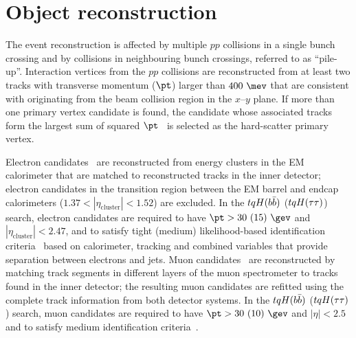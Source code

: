 
\section{Object reconstruction}
\label{sec:objects}

The event reconstruction is affected by multiple $pp$ collisions in a single bunch crossing and by collisions
in neighbouring bunch crossings, referred to as ``pile-up''. 
Interaction vertices from the $pp$ collisions are reconstructed from at least two tracks 
with transverse momentum ($\pt$) larger than $400~\mev$ that are consistent with originating from the 
beam collision region in the $x$--$y$ plane. If more than one primary vertex candidate is found, the
candidate whose associated tracks form the largest sum of squared $\pt$~\cite{ATL-PHYS-PUB-2015-026}
is selected as the hard-scatter primary vertex.

Electron candidates~\cite{ATLAS-CONF-2016-024,ATL-PHYS-PUB-2016-015} are reconstructed from energy 
clusters in the EM calorimeter that are matched to reconstructed tracks in the inner detector;
electron candidates in the transition region between the EM barrel and endcap calorimeters 
($1.37 < |\eta_{\textrm{cluster}}| < 1.52$) are excluded.
In the $tqH(b\bar{b})$ ($tqH(\tau\tau)$) search, electron candidates are required to have $\pt>30~(15)~\gev$ and 
$|\eta_{\textrm{cluster}}| < 2.47$, and to satisfy tight (medium) likelihood-based identification 
criteria~\cite{ATLAS-CONF-2016-024} based on calorimeter, tracking and combined variables that provide 
separation between electrons and jets. 
Muon candidates~\cite{Aad:2016jkr} are reconstructed by matching track segments in %
different layers of the muon spectrometer to tracks found in the inner detector;
the resulting muon candidates are refitted using the complete track information from both detector systems.
In the $tqH(b\bar{b})$ ($tqH(\tau\tau)$) search, muon candidates are required to have $\pt>30~(10)~\gev$ and $|\eta|<2.5$ 
and to satisfy medium identification criteria~\cite{Aad:2016jkr}. 

